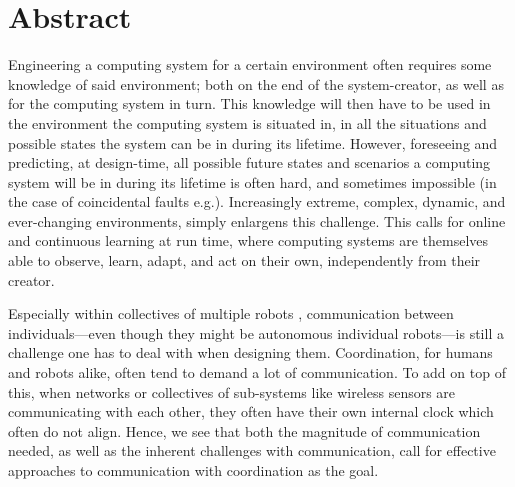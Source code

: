 \chapter*{Abstract}
\label{abstract}

Engineering a computing system for a certain environment often requires some knowledge of said environment; both on the end of the system-creator, as well as for the computing system in turn. This knowledge will then have to be used in the environment the computing system is situated in, in all the situations and possible states the system can be in during its lifetime. However, foreseeing and predicting, at design-time, all possible future states and scenarios a computing system will be in during its lifetime is often hard, and sometimes impossible (in the case of coincidental faults e.g.). Increasingly extreme, complex, dynamic, and ever-changing environments, simply enlargens this challenge. This calls for online and continuous learning at run time, where computing systems are themselves able to observe, learn, adapt, and act on their own, independently from their creator.

Especially within collectives of multiple robots \cite{cocoro, swarm_bot}, communication between individuals—even though they might be autonomous individual robots—is still a challenge one has to deal with when designing them. Coordination, for humans and robots alike, often tend to demand a lot of communication. To add on top of this, when networks or collectives of sub-systems like wireless sensors are communicating with each other, they often have their own internal clock which often do not align. Hence, we see that both the magnitude of communication needed, as well as the inherent challenges with communication, call for effective approaches to communication with coordination as the goal.

